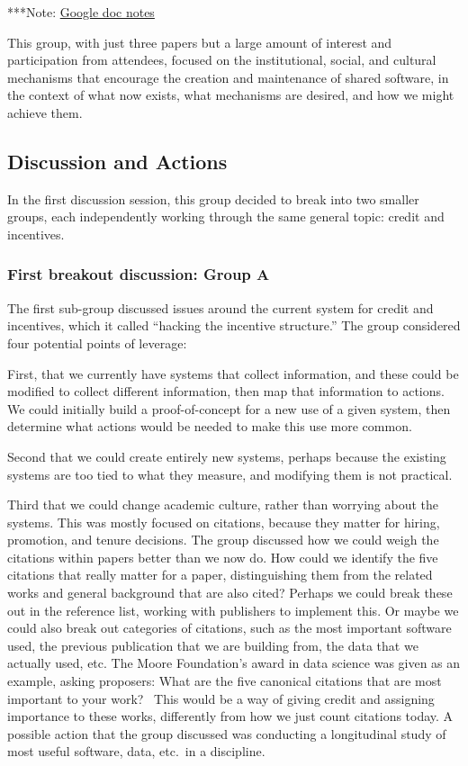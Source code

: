 \documentclass[11pt, oneside]{amsart}
\newcommand{\note}[1]{ {\textcolor{blueish}    { ***Note:      #1 }}}
\begin{document}
\note{\href{http://tinyurl.com/k8ruyn9}{Google doc notes}}

This group, with just three papers but a large amount of interest and
participation from attendees, focused on the institutional, social, and cultural
mechanisms that encourage the creation and maintenance of shared software, in the
context of what now exists, what mechanisms are desired, and how
we might achieve them.


\subsection{Discussion and Actions}

In the first discussion session, this group decided to break into two smaller groups,
each independently working through the same general topic: credit and incentives.

\subsubsection{First breakout discussion: Group A}
The first sub-group discussed issues around the current system for credit and
incentives, which it called ``hacking the incentive structure.'' The
group considered four potential points of leverage:

First, that we currently have systems that collect information, and these could
be modified to collect different information, then map that information to
actions. We could initially build a proof-of-concept for a new use of a given
system, then determine what actions would be needed to make this use more
common.

Second that we could create entirely new systems, perhaps because the existing
systems are too tied to what they measure, and modifying them is not practical.

Third that we could change academic culture, rather than worrying about the
systems. This was mostly focused on citations, because they matter for hiring,
promotion, and tenure decisions. The group discussed how we could weigh the
citations within papers better than we now do. How could we identify the five
citations that really matter for a paper, distinguishing them from the related
works and general background that are also cited? Perhaps we could break these
out in the reference list, working with publishers to implement this. Or maybe
we could also break out categories of citations, such as the most important
software used, the previous publication that we are building from, the data that
we actually used, etc. The Moore Foundation's award in data science was given as
an example, asking proposers: What are the five canonical citations that are
most important to your work?~\cite{moore-canonical} This would be a way of
giving credit and assigning importance to these works, differently from how we
just count citations today. A possible action that the group discussed was
conducting a longitudinal study of most useful software, data, etc.\ in a
discipline.
\end{document}
